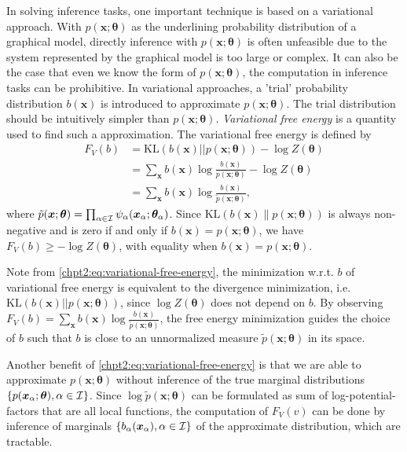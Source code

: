 In solving inference tasks, one important technique is based on a variational approach. With $p(\bm{x};\bm{\theta})$ as the underlining probability distribution of a graphical model, directly inference with $p(\bm{x}; \bm{\theta})$ is often unfeasible due to the system represented by the graphical model is too large or complex. It can also be the case that even we know the form of $p(\bm{x}; \bm{\theta})$, the computation in inference tasks can be prohibitive. In variational approaches, a 'trial' probability distribution $b(\bm{x})$ is introduced to approximate $p(\bm{x};\bm{\theta})$. The trial distribution should be intuitively simpler than $p(\bm{x}; \bm{\theta})$. \textit{Variational free energy} \cite{opper2001advanced} is a quantity used to find such a approximation. The variational free energy is defined by
\begin{align}\label{chpt2:eq:variational-free-energy}
  F_V(b) & = \mathrm{KL}(b( \bm{x}) || p(\bm{x}; \bm{\theta})) - \log{Z(\bm{\theta})} \nonumber \\
         &= \sum_{\bm{x}}b(\bm{x}) \log{\frac{b(\bm{x})}{{p}(\bm{x}; \bm{\theta})}} - \log{Z(\bm{\theta})} \nonumber \\
         & = \sum_{\bm{x}}b(\bm{x}) \log{\frac{b(\bm{x})}{\tilde{p}(\bm{x}; \bm{\theta})}},
\end{align}
where $\tilde{p}(\bm{x}; \bm{\theta}) =  \prod_{\alpha \in \mathcal{I}} \psi_{\alpha}(\bm{x}_{\alpha}; \bm{\theta}_{\alpha})$. Since $\mathrm{KL}(b(\bm{x})\|p(\bm{x};\bm{\theta}))$ is always non-negative and is zero if and only if $b(\bm{x}) = p(\bm{x};\bm{\theta})$, we have $F_V(b) \geq - \log{Z(\bm{\theta})}$, with equality when $b(\bm{x}) = p(\bm{x};\bm{\theta})$.

\begin{remark}
  Note from \ref{chpt2:eq:variational-free-energy}, the minimization w.r.t. $b$ of variational free energy is equivalent to the divergence minimization, i.e. $\mathrm{KL}(b( \bm{x}) || p(\bm{x}; \bm{\theta}))$, since $\log{Z(\bm{\theta})}$ does not depend on $b$. By observing $F_V(b) = \sum_{\bm{x}}b(\bm{x}) \log{\frac{b(\bm{x})}{\tilde{p}(\bm{x}; \bm{\theta})}}$, the free energy minimization guides the choice of $b$ such that $b$ is close to an unnormalized measure $\tilde{p}(\bm{x}; \bm{\theta})$ in its space.

  Another benefit of \ref{chpt2:eq:variational-free-energy} is that we are able to approximate $p(\bm{x}; \bm{\theta})$ without inference of the true marginal distributions $\{p(\bm{x}_{\alpha};\bm{\theta}), \alpha \in \mathcal{I}\}$. Since $\log\tilde{p}(\bm{x}; \bm{\theta})$ can be formulated as sum of log-potential-factors that are all local functions, the computation of $F_V(v)$ can be done by inference of marginals $\left\{ b_{\alpha}(\bm{x}_{\alpha}), \alpha \in \mathcal{I} \right\}$ of the approximate distribution, which are tractable.
\end{remark}


